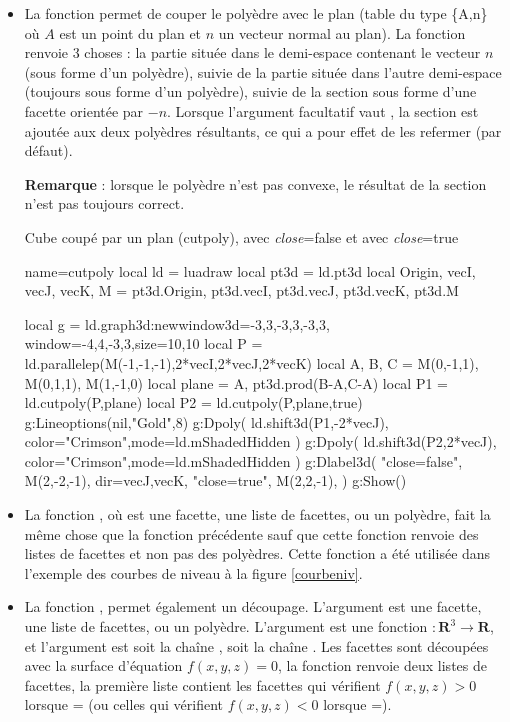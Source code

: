\begin{itemize}
    \item La fonction  permet de couper le polyèdre  avec le plan  (table du type \{A,n\} où $A$ est un point du plan et $n$ un vecteur normal au plan). La fonction renvoie 3 choses : la partie située dans le demi-espace contenant le vecteur $n$ (sous forme d'un polyèdre), suivie de la partie située dans l'autre demi-espace (toujours sous forme d'un polyèdre), suivie de la section sous forme d'une facette orientée par $-n$. Lorsque l'argument facultatif  vaut \true, la section est ajoutée aux deux polyèdres résultants, ce qui a pour effet de les refermer (\false par défaut).\par
    \textbf{Remarque} : lorsque le polyèdre  n'est pas convexe, le résultat de la section n'est pas toujours correct.

\begin{demo}{Cube coupé par un plan (cutpoly), avec \emph{close}=false et avec \emph{close}=true}
\begin{luadraw}{name=cutpoly}
local ld = luadraw
local pt3d = ld.pt3d
local Origin, vecI, vecJ, vecK, M = pt3d.Origin, pt3d.vecI, pt3d.vecJ, pt3d.vecK, pt3d.M

local g = ld.graph3d:new{window3d={-3,3,-3,3,-3,3}, window={-4,4,-3,3},size={10,10}}
local P = ld.parallelep(M(-1,-1,-1),2*vecI,2*vecJ,2*vecK)
local A, B, C = M(0,-1,1), M(0,1,1), M(1,-1,0)
local plane = {A, pt3d.prod(B-A,C-A)}
local P1 = ld.cutpoly(P,plane)
local P2 = ld.cutpoly(P,plane,true)
g:Lineoptions(nil,"Gold",8)
g:Dpoly( ld.shift3d(P1,-2*vecJ), {color="Crimson",mode=ld.mShadedHidden} )
g:Dpoly( ld.shift3d(P2,2*vecJ), {color="Crimson",mode=ld.mShadedHidden} )
g:Dlabel3d(
    "close=false", M(2,-2,-1), {dir={vecJ,vecK}},
    "close=true", M(2,2,-1), {} )
g:Show()
\end{luadraw}
\end{demo}

     \item La fonction , où  est une facette, une liste de facettes, ou un polyèdre, fait la même chose que la fonction précédente sauf que cette fonction renvoie des listes de facettes et non pas des polyèdres. Cette fonction a été utilisée dans l'exemple des courbes de niveau à la figure \ref{courbeniv}.
     
     \item La fonction , permet également un découpage. L'argument  est une facette, une liste de facettes, ou un polyèdre. L'argument  est une fonction $\colon \mathbf R^3 \to \mathbf R$, et l'argument  est soit la chaîne , soit la chaîne . Les facettes sont découpées avec la surface d'équation $f(x,y,z)=0$, la fonction renvoie deux listes de facettes, la première liste contient les facettes qui vérifient $f(x,y,z)>0$ lorsque = (ou celles qui vérifient $f(x,y,z)<0$ lorsque =).
     

\end{itemize}
